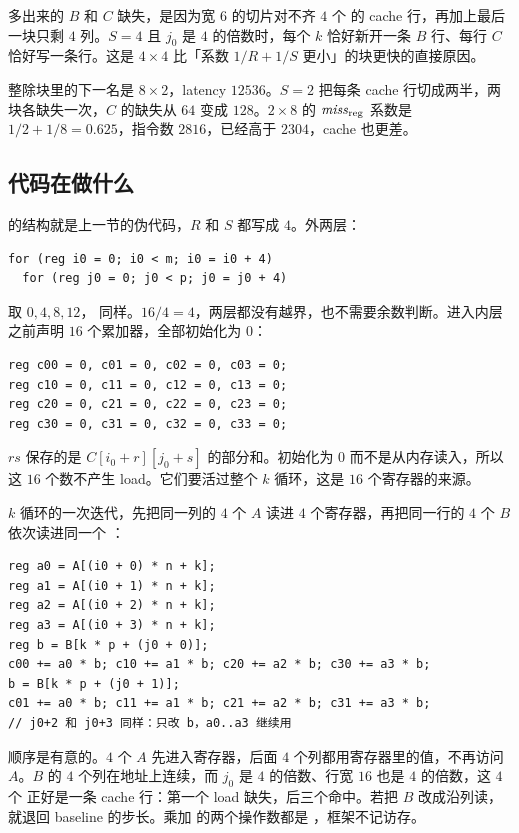 多出来的 $B$ 和 $C$ 缺失，是因为宽 $6$ 的切片对不齐 $4$ 个  的 cache 行，再加上最后一块只剩 $4$ 列。$S=4$ 且 $j_0$ 是 $4$ 的倍数时，每个 $k$ 恰好新开一条 $B$ 行、每行 $C$ 恰好写一条行。这是 $4\times4$ 比「系数 $1/R+1/S$ 更小」的块更快的直接原因。

整除块里的下一名是 $8\times2$，latency $12536$。$S=2$ 把每条 cache 行切成两半，两块各缺失一次，$C$ 的缺失从 $64$ 变成 $128$。$2\times8$ 的 $\mathit{miss}_{\mathrm{reg}}$ 系数是 $1/2+1/8=0.625$，指令数 $2816$，已经高于 $2304$，cache 也更差。

\subsection{代码在做什么}

 的结构就是上一节的伪代码，$R$ 和 $S$ 都写成 $4$。外两层：

\begin{lstlisting}
for (reg i0 = 0; i0 < m; i0 = i0 + 4)
  for (reg j0 = 0; j0 < p; j0 = j0 + 4)
\end{lstlisting}

 取 $0,4,8,12$， 同样。$16/4=4$，两层都没有越界，也不需要余数判断。进入内层之前声明 $16$ 个累加器，全部初始化为 $0$：

\begin{lstlisting}
reg c00 = 0, c01 = 0, c02 = 0, c03 = 0;
reg c10 = 0, c11 = 0, c12 = 0, c13 = 0;
reg c20 = 0, c21 = 0, c22 = 0, c23 = 0;
reg c30 = 0, c31 = 0, c32 = 0, c33 = 0;
\end{lstlisting}

$rs$ 保存的是 $C[i_0+r][j_0+s]$ 的部分和。初始化为 $0$ 而不是从内存读入，所以这 $16$ 个数不产生 load。它们要活过整个 $k$ 循环，这是 $16$ 个寄存器的来源。

$k$ 循环的一次迭代，先把同一列的 $4$ 个 $A$ 读进 $4$ 个寄存器，再把同一行的 $4$ 个 $B$ 依次读进同一个 ：

\begin{lstlisting}
reg a0 = A[(i0 + 0) * n + k];
reg a1 = A[(i0 + 1) * n + k];
reg a2 = A[(i0 + 2) * n + k];
reg a3 = A[(i0 + 3) * n + k];
reg b = B[k * p + (j0 + 0)];
c00 += a0 * b; c10 += a1 * b; c20 += a2 * b; c30 += a3 * b;
b = B[k * p + (j0 + 1)];
c01 += a0 * b; c11 += a1 * b; c21 += a2 * b; c31 += a3 * b;
// j0+2 和 j0+3 同样：只改 b，a0..a3 继续用
\end{lstlisting}

顺序是有意的。$4$ 个 $A$ 先进入寄存器，后面 $4$ 个列都用寄存器里的值，不再访问 $A$。$B$ 的 $4$ 个列在地址上连续，而 $j_0$ 是 $4$ 的倍数、行宽 $16$ 也是 $4$ 的倍数，这 $4$ 个  正好是一条 cache 行：第一个 load 缺失，后三个命中。若把 $B$ 改成沿列读，就退回 baseline 的步长。乘加  的两个操作数都是 ，框架不记访存。

